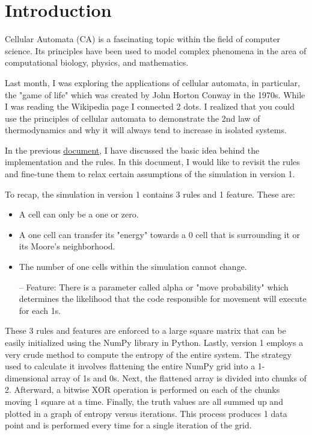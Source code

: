\chapter{Introduction}
Cellular Automata (CA) is a fascinating topic within the field of computer science. Its principles have been used to model complex phenomena in the area of computational biology, physics, and mathematics. \par

\vspace{0.3cm}
\noindent 
Last month, I was exploring the applications of cellular automata, in particular, the "game of life" which was created by John Horton Conway in the 1970s. While I was reading the Wikipedia page I connected 2 dots. I realized that you could use the principles of cellular automata to demonstrate the 2nd law of thermodynamics and why it will always tend to increase in isolated systems. \par

\vspace{0.3cm}
\noindent
In the previous \href{https://github.com/ShiroHusin/Entropy_Simulation/blob/main/Thoughts.pdf}{document}, I have discussed the basic idea behind the implementation and the rules. In this document, I would like to revisit the rules and fine-tune them to relax certain assumptions of the simulation in version 1. \par

\vspace{0.3cm}
\noindent
To recap, the simulation in version 1 contains 3 rules and 1 feature. These are: 
\begin{itemize}
    \item A cell can only be a one or zero. 
    \item A one cell can transfer its "energy" towards a 0 cell that is surrounding it or its Moore's neighborhood. 
    \item The number of one cells within the simulation cannot change. 
    \item[--] Feature: There is a parameter called alpha or "move probability" which determines the likelihood that the code responsible for movement will execute for each 1s.
\end{itemize}

These 3 rules and features are enforced to a large square matrix that can be easily initialized using the NumPy library in Python. Lastly, version 1 employs a very crude method to compute the entropy of the entire system. The strategy used to calculate it involves flattening the entire NumPy grid into a 1-dimensional array of 1s and 0s. Next, the flattened array is divided into chunks of 2. Afterward, a bitwise XOR operation is performed on each of the chunks moving 1 square at a time. Finally, the truth values are all summed up and plotted in a graph of entropy versus iterations. This process produces 1 data point and is performed every time for a single iteration of the grid. \par

